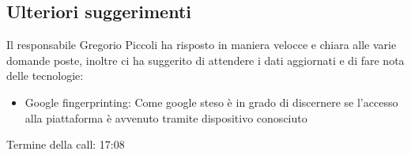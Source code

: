 \subsection{Ulteriori suggerimenti}

Il responsabile Gregorio Piccoli ha risposto in maniera velocce e chiara alle varie domande poste, inoltre ci ha suggerito di attendere i dati aggiornati e di fare nota delle tecnologie:

\begin{itemize}
		\item Google fingerprinting: Come google steso è in grado di discernere se l'accesso alla piattaforma è avvenuto tramite dispositivo conosciuto
\end{itemize}


\noindent
Termine della call: 17:08
